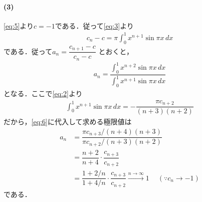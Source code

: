\documentclass[../../main.tex]{subfiles}
\begin{document}
\paragraph{(3)}

\cref{eq:5}より$c=-1$である．従って\cref{eq:3}より
\begin{align}
  c_n - c = \pi \int_0^1 x^{n+1} \sin\pi x \, dx
\end{align}
である．従って$a_n = \dfrac{c_{n+1}-c}{c_n-c}$ とおくと，
\begin{align}
  a_n = \dfrac{\int_0^1 x^{n+2} \sin\pi x \, dx}{\int_0^1 x^{n+1} \sin\pi x \, dx} \label{eq:6}
\end{align}
となる．ここで\cref{eq:2}より
\begin{align}
  \int_0^1 x^{n+1} \sin\pi x \, dx = -\dfrac{\pi c_{n+2}}{(n+3)(n+2)}
\end{align}
だから，\cref{eq:6}に代入して求める極限値は
\begin{align}
  a_n
  & = \dfrac{\pi c_{n+3}/(n+4)(n+3)}{\pi c_{n+2}/(n+3)(n+2)} \\
  &= \dfrac{n+2}{n+4} \cdot \dfrac{c_{n+3}}{c_{n+2}} \\
  &= \dfrac{1+2/n}{1+4/n} \cdot \dfrac{c_{n+3}}{c_{n+2}} \xrightarrow{n\to\infty} 1 \quad \ (\because c_n \to -1)
\end{align}
である．
\end{document}

